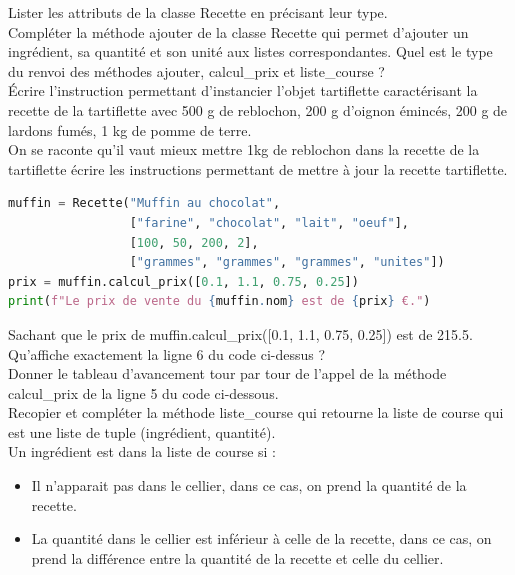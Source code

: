 \begin{Exercise}[title={POO - Recette}]
    \Question Lister les attributs de la classe Recette en précisant leur type.\\
    \emptybox{1cm}
    \Question Compléter la méthode ajouter de la classe Recette qui permet d’ajouter un ingrédient, sa quantité et son unité aux listes correspondantes.
    \Question Quel est le type du renvoi des méthodes ajouter, calcul\_prix et liste\_course ?\\
    \emptybox{1cm}
    \Question Écrire l’instruction permettant d’instancier l’objet tartiflette caractérisant la recette de la tartiflette avec 	500 g de reblochon, 200 g d'oignon émincés, 200 g de lardons fumés, 1 kg de pomme de terre.\\
    \emptybox{1cm}
    \Question On se raconte qu'il vaut mieux mettre 1kg de reblochon dans la recette de la tartiflette écrire les instructions permettant de mettre à jour la recette tartiflette.\\
    \emptybox{2cm}
\begin{lstlisting}[language=Python]
muffin = Recette("Muffin au chocolat",
                 ["farine", "chocolat", "lait", "oeuf"],
                 [100, 50, 200, 2],
                 ["grammes", "grammes", "grammes", "unites"])
prix = muffin.calcul_prix([0.1, 1.1, 0.75, 0.25])
print(f"Le prix de vente du {muffin.nom} est de {prix} €.")
\end{lstlisting}
    \Question Sachant que le prix de muffin.calcul\_prix([0.1, 1.1, 0.75, 0.25]) est de 215.5.  Qu'affiche exactement la ligne 6 du code ci-dessus ?\\
    \emptybox{1cm}
    \Question Donner le tableau d'avancement tour par tour de l'appel de la méthode calcul\_prix de la ligne 5 du code ci-dessous.\\
    \emptybox{5cm}
    \Question Recopier et compléter la méthode liste\_course qui retourne la liste de course qui est une liste de tuple (ingrédient, quantité).\\
    Un ingrédient est dans la liste de course si :
    \begin{itemize}
        \item Il n'apparait pas dans le cellier, dans ce cas, on prend la quantité de la recette.
        \item La quantité dans le cellier est inférieur à celle de la recette, dans ce cas, on prend la différence entre la quantité de la recette et celle du cellier.
    \end{itemize}
    \emptybox{10cm}
\end{Exercise}